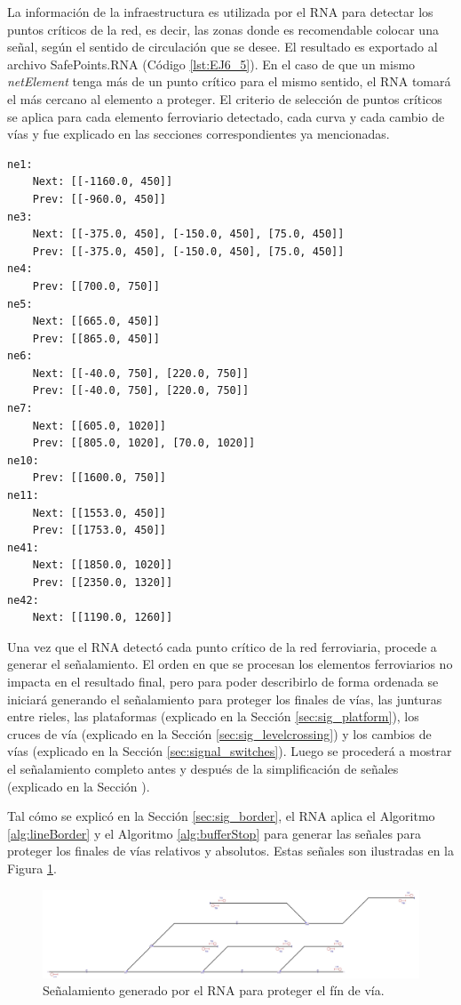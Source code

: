 	La información de la infraestructura es utilizada por el RNA para detectar los puntos críticos de la red, es decir, las zonas donde es recomendable colocar una señal, según el sentido de circulación que se desee. El resultado es exportado al archivo SafePoints.RNA (Código \ref{lst:EJ6_5}). En el caso de que un mismo \textit{netElement} tenga más de un punto crítico para el mismo sentido, el RNA tomará el más cercano al elemento a proteger. El criterio de selección de puntos críticos se aplica para cada elemento ferroviario detectado, cada curva y cada cambio de vías y fue explicado en las secciones correspondientes ya mencionadas.
	
	\begin{lstlisting}[language = {}, caption = SafePoints.RNA, label = {lst:EJ6_5}]
ne1:
	Next: [[-1160.0, 450]]
	Prev: [[-960.0, 450]]
ne3:
	Next: [[-375.0, 450], [-150.0, 450], [75.0, 450]]
	Prev: [[-375.0, 450], [-150.0, 450], [75.0, 450]]
ne4:
	Prev: [[700.0, 750]]
ne5:
	Next: [[665.0, 450]]
	Prev: [[865.0, 450]]
ne6:
	Next: [[-40.0, 750], [220.0, 750]]
	Prev: [[-40.0, 750], [220.0, 750]]
ne7:
	Next: [[605.0, 1020]]
	Prev: [[805.0, 1020], [70.0, 1020]]
ne10:
	Prev: [[1600.0, 750]]
ne11:
	Next: [[1553.0, 450]]
	Prev: [[1753.0, 450]]
ne41:
	Next: [[1850.0, 1020]]
	Prev: [[2350.0, 1320]]
ne42:
	Next: [[1190.0, 1260]]
	\end{lstlisting}	
	
	Una vez que el RNA detectó cada punto crítico de la red ferroviaria, procede a generar el señalamiento. El orden en que se procesan los elementos ferroviarios no impacta en el resultado final, pero para poder describirlo de forma ordenada se iniciará generando el señalamiento para proteger los finales de vías, las junturas entre rieles, las plataformas (explicado en la Sección \ref{sec:sig_platform}), los cruces de vía (explicado en la Sección \ref{sec:sig_levelcrossing}) y los cambios de vías (explicado en la Sección \ref{sec:signal_switches}). Luego se procederá a mostrar el señalamiento completo antes y después de la simplificación de señales (explicado en la Sección \label{sec:simplificacion}). 
	
	Tal cómo se explicó en la Sección \ref{sec:sig_border}, el RNA aplica el Algoritmo \ref{alg:lineBorder} y el Algoritmo \ref{alg:bufferStop} para generar las señales para proteger los finales de vías relativos y absolutos. Estas señales son ilustradas en la Figura \ref{fig:EJ6_3}.
	
	\begin{figure}[H]
		\centering
		\includegraphics[width=1\textwidth]{resultados-obtenidos/ejemplo6/images/6_step1.png}
		\centering\caption{Señalamiento generado por el RNA para proteger el fín de vía.}
		\label{fig:EJ6_3}
	\end{figure}

